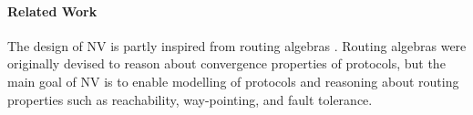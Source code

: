 \documentclass[sigconf,10pt]{acmart}
\begin{document}
\paragraph{Related Work} The design of NV is partly inspired from
routing algebras \cite{routingalgebra,metarouting}. Routing
algebras were originally devised to reason about convergence
properties of protocols, but the main goal of NV is to enable modelling of
protocols and reasoning about routing properties such as reachability,
way-pointing, and fault tolerance.





\end{document}
